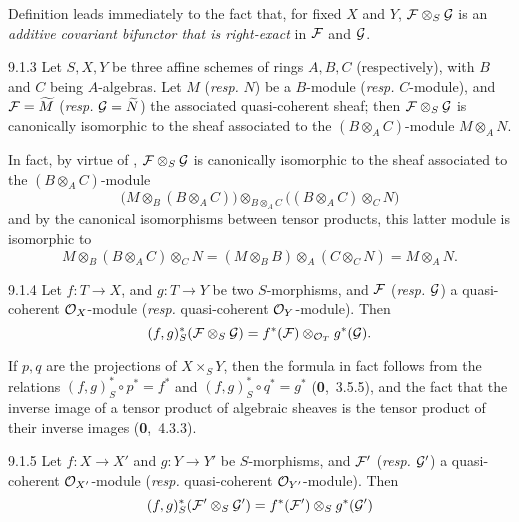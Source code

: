 \documentclass[../main.tex]{subfiles}
\begin{document}
Definition  leads immediately to the fact that, for fixed $X$ and $Y$, $\mathcal{F}\otimes_S\mathcal{G}$ is an \emph{additive covariant bifunctor that is right-exact} in $\mathcal{F}$ and $\mathcal{G}$.

\begin{env}[Proposition]{9.1.3}
    Let $S,X,Y$ be three affine schemes of rings $A,B,C$ (respectively), with $B$ and $C$ being $A$-algebras.
    Let $M$ (\emph{resp.} $N$) be a $B$-module (\emph{resp.} $C$-module), and $\mathcal{F}=\widetilde{M}$ (\emph{resp.} $\mathcal{G}=\widetilde{N}$) the associated quasi-coherent sheaf; then $\mathcal{F}\otimes_S\mathcal{G}$ is canonically isomorphic to the sheaf associated to the $(B\otimes_A C)$-module $M\otimes_A N$.
\end{env}

In fact, by virtue of , $\mathcal{F}\otimes_S\mathcal{G}$ is canonically isomorphic to the sheaf associated to the $(B\otimes_A C)$-module
\[
  \big( M\otimes_B(B\otimes_A C) \big) \otimes_{B\otimes_A C} \big( (B\otimes_A C)\otimes_C N \big)
\]
and by the canonical isomorphisms between tensor products, this latter module is isomorphic to
\[
  M\otimes_B(B\otimes_A C)\otimes_C N = (M\otimes_B B)\otimes_A(C\otimes_C N) = M\otimes_A N.
\]

\begin{env}[Proposition]{9.1.4}
    Let $f\colon T\to X$, and $g\colon T\to Y$ be two $S$-morphisms, and $\mathcal{F}$ (\emph{resp.} $\mathcal{G}$) a quasi-coherent $\mathcal{O}_X$-module (\emph{resp.} quasi-coherent $\mathcal{O}_Y$-module).
    Then
    \[
      (f,g)^*_S(\mathcal{F}\otimes_S\mathcal{G}) = f^*(\mathcal{F})\otimes_{\mathcal{O}_T}g^*(\mathcal{G}).
    \]
\end{env}

If $p,q$ are the projections of $X\times_S Y$, then the formula in fact follows from the relations $(f,g)^\ast_S\circ p^\ast=f^\ast$ and $(f,g)^\ast_S\circ q^\ast=g^\ast$ (\textbf{0},~3.5.5), and the fact that the inverse image of a tensor product of algebraic sheaves is the tensor product of their inverse images (\textbf{0},~4.3.3).

\begin{env}[Corollary]{9.1.5}
    Let $f\colon X\to X'$ and $g\colon Y\to Y'$ be $S$-morphisms, and $\mathcal{F}'$ (\emph{resp.} $\mathcal{G}'$) a quasi-coherent $\mathcal{O}_{X'}$-module (\emph{resp.} quasi-coherent $\mathcal{O}_{Y'}$-module).
    Then
    \[
        (f,g)^\ast_S(\mathcal{F}'\otimes_S\mathcal{G}') = f^\ast(\mathcal{F}')\otimes_S g^\ast(\mathcal{G}')
    \]
\end{env}
\end{document}

